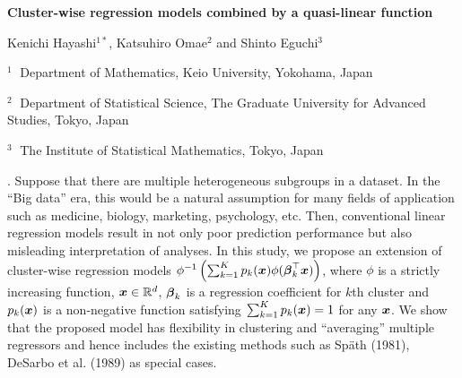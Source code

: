 \documentclass[12pt]{article}
\def\vec#1{\mbox{\boldmath$#1$}}
\begin{document}
\begin{flushleft}


{\LARGE\bf Cluster-wise regression models combined by a quasi-linear function }


\vspace{1.0cm}

Kenichi Hayashi$^{1*}$, Katsuhiro Omae$^{2}$ and Shinto Eguchi$^3$

\begin{description}

\item $^1 \;$ Department of Mathematics, Keio University, Yokohama, Japan

\item $^2 \;$ Department of Statistical Science, The Graduate University for Advanced Studies, Tokyo, Japan

\item $^3 \;$ The Institute of Statistical Mathematics, Tokyo, Japan


\end{description}

\end{flushleft}


\vspace{0.75cm}

. 
Suppose that there are multiple heterogeneous subgroups in a dataset. 
In the ``Big data'' era, this would be a natural assumption for many fields of application such as medicine, biology, marketing, psychology, etc. 
Then, conventional linear regression models result in not only poor prediction performance but also misleading interpretation of analyses. 
In this study, we propose an extension of cluster-wise regression models  $\phi^{-1}\left(\sum_{k=1}^Kp_k(\vec{x})\phi(\vec{\beta}_k^\top\vec{x})\right)$, where $\phi$ is a strictly increasing function, $\vec{x}\in\mathbb{R}^d$, $\vec{\beta}_k$ is a regression coefficient for $k$th cluster and $p_k(\vec{x})$ is a non-negative function satisfying $\sum_{k=1}^Kp_k(\vec{x})=1$ for any $\vec{x}$. 
We show that the proposed model has flexibility in clustering and ``averaging'' multiple regressors and hence includes the existing methods such as Sp\"{a}th (1981), DeSarbo et al. (1989) as special cases. 
\end{document}

